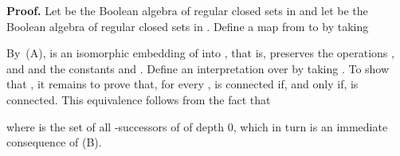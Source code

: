 \documentclass{article}
\newcommand{\qedsymbol}{\ding{113}}
\newenvironment{proof}{\par\noindent\textbf{Proof.}}{\mbox{}\hfill\qedsymbol\par\bigskip}
\begin{document}
\begin{proof}
Let  be the Boolean algebra of regular closed sets in  and let  be the Boolean algebra of regular closed sets in .
Define a map  from  to  by taking

By~(A),  is an isomorphic embedding of  into , that is,  preserves
the operations ,  and  and the constants  and .
Define an interpretation  over  by taking . To show that , it remains to prove that, for every ,  is connected if, and only if,  is connected. This equivalence follows from the fact that

where  is the set of all -successors of  of depth 0, which in turn is an immediate consequence of (B).
\end{proof}
\end{document}
